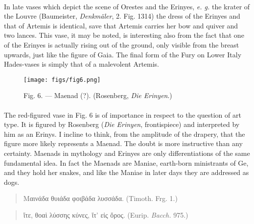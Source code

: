 \documentclass[a4paper, 11pt, oneside, polutonikogreek, english]{article}
\begin{document}
\paragraph{}
In late vases which depict the scene of Orestes and the Erinyes, \emph{e. g.} the krater of the Louvre (Baumeister, \emph{Denkmäler}, 2. Fig. 1314) the dress of the Erinyes and that of Artemis is identical, save that Artemis carries her bow and quiver and two lances. This vase, it may be noted, is interesting also from the fact that one of the Erinyes is actually rising out of the ground, only visible from the breast upwards, just like the figure of Gaia. The final form of the Fury on Lower Italy Hades-vases is simply that of a malevolent Artemis.
\begin{figure}[H]
\centering
\texttt{[image: figs/fig6.png]}
\caption{\Fontauri Fig. 6. --- Maenad (?). (Rosenberg, \emph{Die Erinyen}.)}
\end{figure}
\paragraph{}
The red-figured vase in Fig. 6 is of importance in respect to the question of art type. It is figured by Rosenberg (\emph{Die Erinyen}, frontispiece) and interpreted by him as an Erinys. I incline to think, from the amplitude of the drapery, that the figure more likely represents a Maenad. The doubt is more instructive than any certainty. Maenads in mythology and Erinyes are only differentiations of the same fundamental idea. In fact the Maenads are Maniae, earth-born ministrants of Ge, and they hold her snakes, and like the Maniae in later days they are addressed as dogs.
\begin{quotation}
Μαινάδα θυιάδα φοιβάδα λυσσάδα. (Timoth. Frg. 1.)
\end{quotation}
\begin{quotation}
ἴτε, θοαὶ λύσσης κύνες, ἴτ' εἰς ὄρος. (Eurip. \emph{Bacch.} 975.)
\end{quotation}
\end{document}
